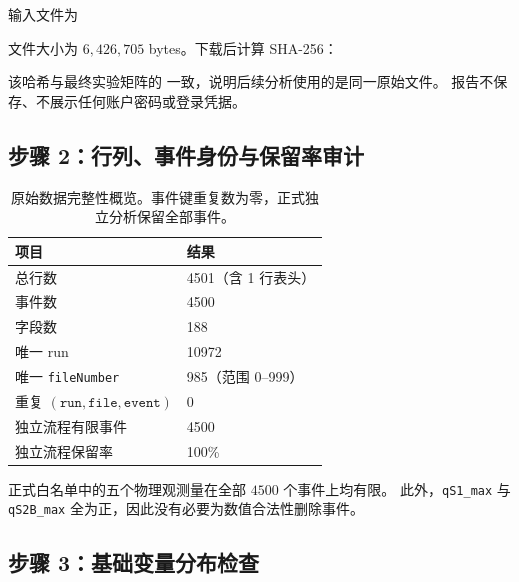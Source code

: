 \documentclass[UTF8,12pt,a4paper,oneside,fontset=none]{ctexart}
\numberwithin{equation}{section}
\begin{document}
输入文件为

\begin{center}
\end{center}

文件大小为 \(6{,}426{,}705\) bytes。下载后计算 SHA-256：

\begin{center}
\small\ttfamily
{}
\end{center}

该哈希与最终实验矩阵的  一致，说明后续分析使用的是同一原始文件。
报告不保存、不展示任何账户密码或登录凭据。

\subsection{步骤 2：行列、事件身份与保留率审计}

\begin{table}[H]
\centering
\caption{原始数据完整性概览。事件键重复数为零，正式独立分析保留全部事件。}
\label{tab:data-audit}
\begin{tabularx}{0.88\textwidth}{Y R{3.5cm}}
\toprule
项目 & 结果 \\
\midrule
总行数 & 4501（含 1 行表头） \\
事件数 & 4500 \\
字段数 & 188 \\
唯一 run & 10972 \\
唯一 \texttt{fileNumber} & 985（范围 0--999） \\
重复 \((\texttt{run},\texttt{file},\texttt{event})\) & 0 \\
独立流程有限事件 & 4500 \\
独立流程保留率 & 100\% \\
\bottomrule
\end{tabularx}
\end{table}

正式白名单中的五个物理观测量在全部 \(4500\) 个事件上均有限。
此外，\texttt{qS1\_max} 与 \texttt{qS2B\_max} 全为正，因此没有必要为数值合法性删除事件。

\subsection{步骤 3：基础变量分布检查}
\end{document}
